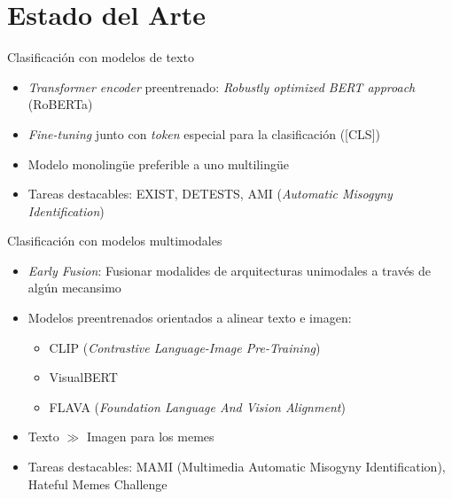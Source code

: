 \section{Estado del Arte}
\begin{frame}{Clasificaci\'on con modelos de texto}

   \begin{itemize}
    \item \textit{Transformer encoder} preentrenado: \textit{Robustly optimized BERT approach} (RoBERTa) 
    \item \textit{Fine-tuning} junto con \textit{token} especial para la  clasificaci\'on ([CLS])
    \item Modelo monoling\"ue preferible a uno multiling\"ue
    \item Tareas destacables: EXIST, DETESTS, AMI (\textit{Automatic Misogyny Identification})
\end{itemize}
\end{frame}

\begin{frame}{Clasificaci\'on con modelos multimodales}
    \begin{itemize}
        \item \textit{Early Fusion}: Fusionar modalides de arquitecturas unimodales a trav\'es de alg\'un mecansimo
        \item Modelos preentrenados orientados a alinear texto e imagen:
        \begin{itemize}
            \item CLIP (\textit{Contrastive Language-Image Pre-Training})
            \item VisualBERT
            \item FLAVA (\textit{Foundation Language And Vision Alignment})
        \end{itemize}
        \item Texto $\gg$ Imagen  para los memes 
        \item Tareas destacables: MAMI (Multimedia Automatic Misogyny Identification), Hateful Memes Challenge
    \end{itemize}
\end{frame}

